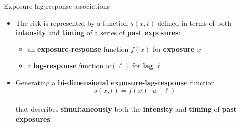 \documentclass[english]{beamer}
\newcommand{\alertblue}[1]{{\color{blue}#1}}
\begin{document}
\begin{frame}{Exposure-lag-response associations }
    \begin{itemize}
        \item The risk is represented by a function \alertblue{$s(x, t)$} defined in terms of both \textbf{\alertblue{intensity}} and \textbf{\alertblue{timing}} of a series of \textbf{\alertblue{past exposures}}:
        \vspace{0.2cm}
        \begin{itemize}
            \item an \textbf{\alertblue{exposure-response}} function \alertblue{$f(x)$} for \textbf{\alertblue{exposure $x$}} 
            \vspace{0.2cm}
            \item a \textbf{\alertblue{lag-response}} function \alertblue{$w(\ell)$} for \textbf{\alertblue{lag $\ell$}}
        \end{itemize}
        \vspace{0.2cm}
        \item Generating a \textbf{\alertblue{bi-dimensional exposure-lag-response}} function 
        \[s(x,t) = f(x) \cdot w(\ell)\] \\
        
        that describes \alertblue{\textbf{simultaneously}} both the \textbf{\alertblue{intensity}} and \textbf{\alertblue{timing}} of \textbf{\alertblue{past exposures}} 
        \end{itemize}   
\end{frame}
\end{document}
